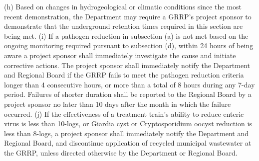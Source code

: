 (h) Based on changes in hydrogeological or climatic conditions since the most recent demonstration, the Department may require a GRRP's project sponsor to demonstrate that the underground retention times required in this section are being met.
(i) If a pathogen reduction in subsection (a) is not met based on the ongoing monitoring required pursuant to subsection (d), within 24 hours of being aware a project sponsor shall immediately investigate the cause and initiate corrective actions. The project sponsor shall immediately notify the Department and Regional Board if the GRRP fails to meet the pathogen reduction criteria longer than 4 consecutive hours, or more than a total of 8 hours during any 7-day period. Failures of shorter duration shall be reported to the Regional Board by a project sponsor no later than 10 days after the month in which the failure occurred.
(j) If the effectiveness of a treatment train's ability to reduce enteric virus is less than 10-logs, or Giardia cyst or Cryptosporidium oocyst reduction is less than 8-logs, a project sponsor shall immediately notify the Department and Regional Board, and discontinue application of recycled municipal wastewater at the GRRP, unless directed otherwise by the Department or Regional Board.

